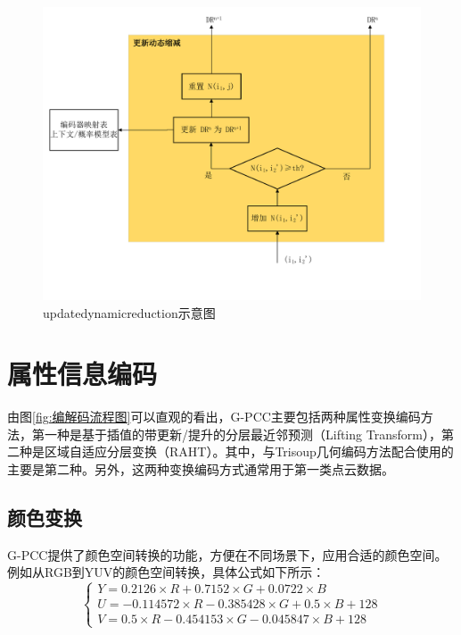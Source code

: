 \documentclass[bachelor,print,msfonts]{xduthesis}
\begin{document}
\begin{figure}[htb]
    \centering
    \includegraphics[scale=0.3]{image/更新动态OBUF_crop.pdf}
    \caption{updatedynamicreduction示意图}
    \label{fig:updatedynamicreduction示意图}
\end{figure}

\section{属性信息编码}
\label{sec:organization}
由图\ref{fig:编解码流程图}可以直观的看出，G-PCC主要包括两种属性变换编码方法，第一种是基于插值的带更新/提升的分层最近邻预测（Lifting Transform），第二种是区域自适应分层变换（RAHT）。其中，与Trisoup几何编码方法配合使用的主要是第二种。另外，这两种变换编码方式通常用于第一类点云数据。
\subsection{颜色变换}
G-PCC提供了颜色空间转换的功能，方便在不同场景下，应用合适的颜色空间。例如从RGB到YUV的颜色空间转换，具体公式如下所示：
\begin{equation}
    \left\{\begin{array}{c}
        Y=0.2126 \times R+0.7152 \times G+0.0722 \times B       \\
        U=-0.114572 \times R-0.385428 \times G+0.5 \times B+128 \\
        V=0.5 \times R-0.454153 \times G-0.045847 \times B+128
    \end{array}\right.
\end{equation}
\end{document}
